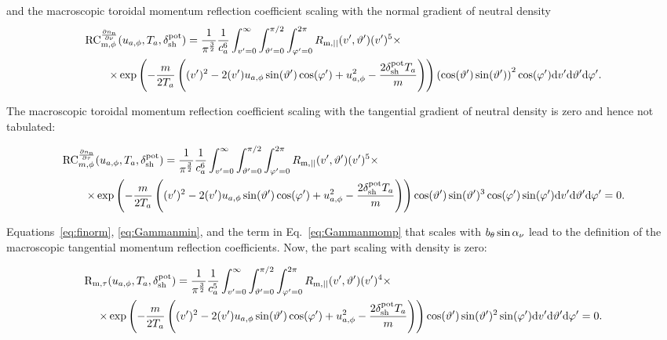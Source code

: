 \noindent and the macroscopic toroidal momentum reflection coefficient scaling with the normal gradient of neutral density
\begin{align}
    \mathrm{RC}_{\mathrm{m},\phi}^{\frac{\partial n_\mathrm{n}}{\partial \nu}} & (u_{a,\phi},T_a,\delta_{\mathrm{sh}}^{\mathrm{pot}}) =
    \frac{1}{\pi^\frac{3}{2}} \frac{1}{c_a^6} \int_{v'=0}^{\infty} \int_{\vartheta'=0}^{\pi/2} \int_{\varphi'=0}^{2\pi}
    R_{\mathrm{m,||}}(v',\vartheta') (v')^5 \times \nonumber \\
    \times & \exp \left( - \frac{m}{2 T_a} \left( (v')^2-2 (v') u_{a,\phi} \sin (\vartheta') \cos (\varphi') + u_{a,\phi}^2 - \frac{2 \delta_{\mathrm{sh}}^{\mathrm{pot}} T_a}{m} \right) \right) \left( \cos (\vartheta') \sin (\vartheta') \right)^2 \cos (\varphi')
    \mathrm{d} v' \mathrm{d} \vartheta' \mathrm{d} \varphi'. \label{eq:rmxtwoi_def}
\end{align}

\noindent The macroscopic toroidal momentum reflection coefficient scaling with the tangential gradient of neutral density is zero and hence not tabulated:

\begin{align}
     \mathrm{RC}_{m,\phi}^{\frac{\partial n_\mathrm{n}}{\partial \tau}} & (u_{a,\phi},T_a,\delta_{\mathrm{sh}}^{\mathrm{pot}}) =
    \frac{1}{\pi^\frac{3}{2}} \frac{1}{c_a^6} \int_{v'=0}^{\infty} \int_{\vartheta'=0}^{\pi/2} \int_{\varphi'=0}^{2\pi}
    R_{\mathrm{m,||}}(v',\vartheta') (v')^5 \times \nonumber \\
    \times & \exp \left( - \frac{m}{2 T_a} \left( (v')^2-2 (v') u_{a,\phi} \sin (\vartheta') \cos (\varphi') + u_{a,\phi}^2 - \frac{2 \delta_{\mathrm{sh}}^{\mathrm{pot}} T_a}{m} \right) \right) \cos (\vartheta') \sin (\vartheta')^3 \cos (\varphi') \sin (\varphi')
    \mathrm{d} v' \mathrm{d} \vartheta' \mathrm{d} \varphi' = 0.
\end{align}

\noindent Equations~\eqref{eq:finorm}, \eqref{eq:Gammanmin}, and the term in Eq.~\eqref{eq:Gammanmomp} that scales with $b_{\theta} \sin \alpha_{\nu}$ lead to the definition of the macroscopic tangential momentum reflection coefficients. Now, the part scaling with density is zero:

\begin{align}
    \mathrm{R}_{\mathrm{m},\tau} & (u_{a,\phi},T_a,\delta_{\mathrm{sh}}^{\mathrm{pot}}) =
         \frac{1}{\pi^\frac{3}{2}} \frac{1}{c_a^5} \int_{v'=0}^{\infty} \int_{\vartheta'=0}^{\pi/2} \int_{\varphi'=0}^{2\pi}
    R_{\mathrm{m,||}}(v',\vartheta') (v')^4 \times \nonumber \\
    \times & \exp \left( - \frac{m}{2 T_a} \left( (v')^2-2 (v') u_{a,\phi} \sin (\vartheta') \cos (\varphi') + u_{a,\phi}^2 - \frac{2 \delta_{\mathrm{sh}}^{\mathrm{pot}} T_a}{m} \right) \right) \cos (\vartheta') \sin (\vartheta')^2 \sin (\varphi')
    \mathrm{d} v' \mathrm{d} \vartheta' \mathrm{d} \varphi' = 0.
\end{align}

